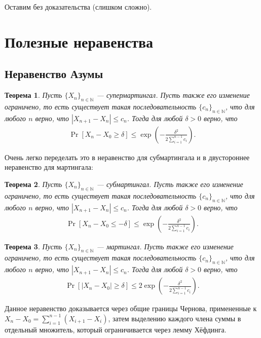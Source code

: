 \documentclass[12pt]{article}
\newcommand\N{\mathbb{N}}
\newtheorem{theorem}{Теорема}
\begin{document}
Оставим без доказательства (слишком сложно).

\section{Полезные неравенства}

\subsection{Неравенство Азумы}
\begin{theorem}
  Пусть $\{X_n\}_{n \in \N}$ --- супермартингал. Пусть также его изменение ограничено, то есть существует такая последовательность $\{c_n\}_{n \in \N}$, что для любого $n$ верно, что $|X_{n + 1} - X_n| \le c_n$. Тогда для любой $\delta > 0$ верно, что
  \begin{align*}
    \Pr[X_n - X_0 \ge \delta] \le \exp\left(-\frac{\delta^2}{2 \sum_{i = 1}^{n - 1}c_i}\right).
  \end{align*}
\end{theorem}

Очень легко переделать это в неравенство для субмартингала и в двустороннее неравенство для мартингала:

\begin{theorem}
  Пусть $\{X_n\}_{n \in \N}$ --- субмартингал. Пусть также его изменение ограничено, то есть существует такая последовательность $\{c_n\}_{n \in \N}$, что для любого $n$ верно, что $|X_{n + 1} - X_n| \le c_n$. Тогда для любой $\delta > 0$ верно, что
  \begin{align*}
    \Pr[X_n - X_0 \le -\delta] \le \exp\left(-\frac{\delta^2}{2 \sum_{i = 1}^{n - 1}c_i}\right).
  \end{align*}
\end{theorem}

\begin{theorem}
  Пусть $\{X_n\}_{n \in \N}$ --- мартингал. Пусть также его изменение ограничено, то есть существует такая последовательность $\{c_n\}_{n \in \N}$, что для любого $n$ верно, что $|X_{n + 1} - X_n| \le c_n$. Тогда для любой $\delta > 0$ верно, что
  \begin{align*}
    \Pr[|X_n - X_0| \ge \delta] \le 2\exp\left(-\frac{\delta^2}{2 \sum_{i = 1}^{n - 1}c_i}\right).
  \end{align*}
\end{theorem}

Данное неравенство доказывается через общие границы Чернова, примененные к $X_n - X_0 = \sum_{i = 1}^{n - 1} (X_{i + 1} - X_i)$, затем выделению каждого члена суммы в отдельный множитель, который ограничивается через лемму Хёфдинга. 
\end{document}
